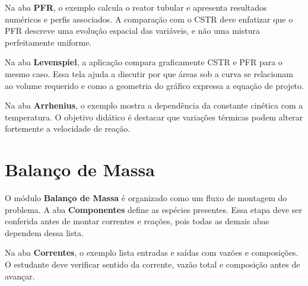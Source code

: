 
Na aba \textbf{PFR}, o exemplo calcula o reator tubular e apresenta resultados numéricos e perfis associados. A comparação com o CSTR deve enfatizar que o PFR descreve uma evolução espacial das variáveis, e não uma mistura perfeitamente uniforme.


Na aba \textbf{Levenspiel}, a aplicação compara graficamente CSTR e PFR para o mesmo caso. Essa tela ajuda a discutir por que áreas sob a curva se relacionam ao volume requerido e como a geometria do gráfico expressa a equação de projeto.


Na aba \textbf{Arrhenius}, o exemplo mostra a dependência da constante cinética com a temperatura. O objetivo didático é destacar que variações térmicas podem alterar fortemente a velocidade de reação.


\section{Balanço de Massa}

O módulo \textbf{Balanço de Massa} é organizado como um fluxo de montagem do problema. A aba \textbf{Componentes} define as espécies presentes. Essa etapa deve ser conferida antes de montar correntes e reações, pois todas as demais abas dependem dessa lista.


Na aba \textbf{Correntes}, o exemplo lista entradas e saídas com vazões e composições. O estudante deve verificar sentido da corrente, vazão total e composição antes de avançar.


